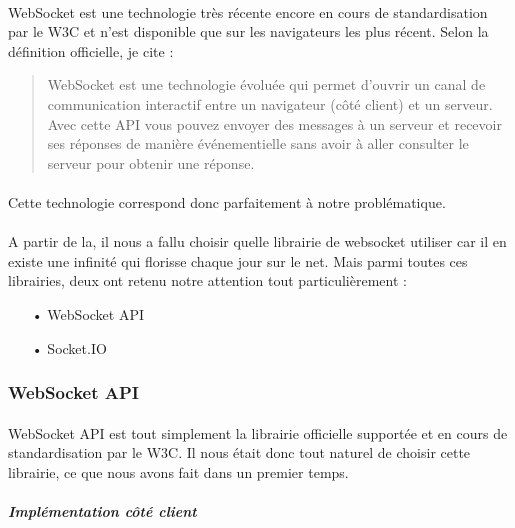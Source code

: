 \documentclass[a4paper,12pt]{report}
\begin{document}
	\paragraph*{}
	WebSocket est une technologie très récente encore en cours de standardisation par le W3C et n'est disponible que sur les navigateurs les plus récent.
	Selon la définition officielle, je cite : \\
	\begin{quotation}
	WebSocket est une technologie évoluée qui permet d'ouvrir un canal de communication interactif entre un navigateur (côté client) et un serveur. \\Avec cette API vous pouvez envoyer des messages à un serveur et recevoir ses réponses de manière événementielle sans avoir à aller consulter le serveur pour obtenir une réponse.
	\end{quotation}
	\paragraph*{}
	Cette technologie correspond donc parfaitement à notre problématique.
	\paragraph*{}
	A partir de la, il  nous a fallu choisir quelle librairie de websocket utiliser car il en existe une infinité qui florisse chaque jour sur le net. Mais parmi toutes ces librairies, deux ont retenu notre attention tout particulièrement :
	\\
	\begin{itemize}
		\item[•] WebSocket API 
		\item[•] Socket.IO
	\end{itemize}		
	\paragraph*{}
	\subsubsection{WebSocket API}
	\paragraph*{}
	WebSocket API est tout simplement la librairie officielle supportée et en cours de standardisation par le W3C.
	Il nous était donc tout naturel de choisir cette librairie, ce que nous avons fait dans un premier temps.
	\paragraph*{}
	\textit{\textbf{Implémentation côté client}} 
\end{document}
